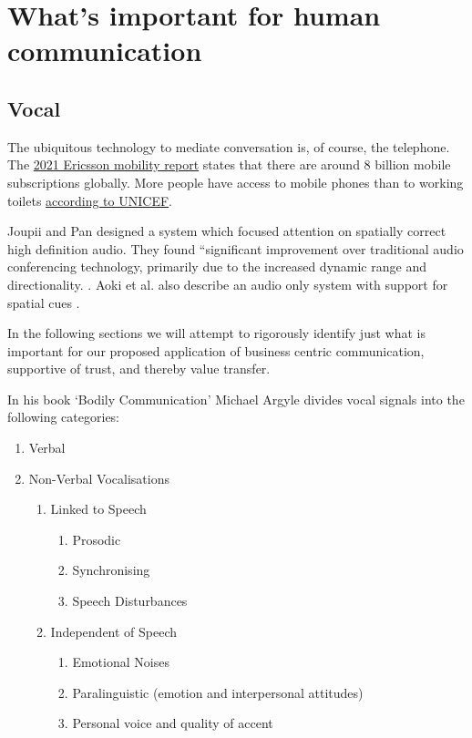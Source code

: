 \section{What's important for human communication}
\subsection{Vocal}
The ubiquitous technology to mediate conversation is, of course, the telephone. The \href{https://www.ericsson.com/en/reports-and-papers/mobility-report/reports/november-2021}{2021 Ericsson mobility report}  states that there are around 8 billion mobile subscriptions globally. More people have access to mobile phones than to working toilets \href{https://www.unicef.org/innovation/stories/more-cellphones-toilets}{according to UNICEF}.\par
Joupii and Pan designed a system which focused attention on spatially correct high definition audio. They found ``significant improvement over traditional audio conferencing technology, primarily due to the increased dynamic range and directionality. \cite{Jouppi2002}. Aoki et al. also describe an audio only system with support for spatial cues \cite{Aoki2003}.\par
In the following sections we will attempt to rigorously identify just what is important for our proposed application of business centric communication, supportive of trust, and thereby value transfer.\par
In his book `Bodily Communication' \cite{Argyle1988} Michael Argyle divides vocal signals into the following categories:
\begin{enumerate}
\item Verbal
\item Non-Verbal Vocalisations
\begin{enumerate}
       \item Linked to Speech
       \begin{enumerate}
         \item   Prosodic
         \item   Synchronising
         \item   Speech Disturbances
         \end{enumerate}
      \item  Independent of Speech
      \begin{enumerate}
        \item    Emotional Noises
         \item   Paralinguistic (emotion and interpersonal attitudes)
         \item   Personal voice and quality of accent
         \end{enumerate}
\end{enumerate}
\end{enumerate}               

